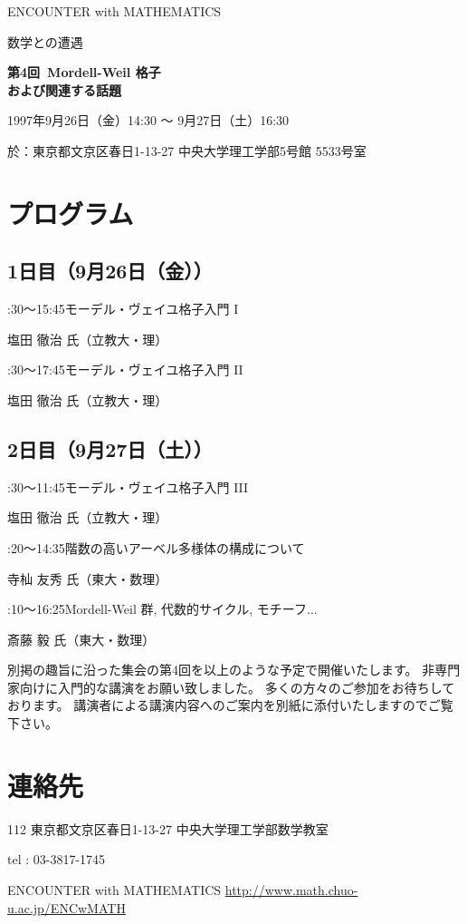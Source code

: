 \documentclass[uplatex,dvipdfmx]{jlreq}
\newcommand{\talk}[3]{%
\noindent
#1\quad #2\par
\hspace*{2em}#3\par\smallskip
}
\newcommand{\EwMnumber}{第4回}
\newcommand{\EwMtitle}{Mordell-Weil 格子\\[2mm]\large および関連する話題}
\newcommand{\EwMdate}{1997年9月26日（金）14:30 ～ 9月27日（土）16:30}
\newcommand{\EwMplace}{東京都文京区春日1-13-27 中央大学理工学部5号館 5533号室}
\newcommand{\EwMtitleblock}{

\vspace*{-5mm}

\begin{center}

{\Large ENCOUNTER with MATHEMATICS}

\vspace{2mm}

{\large 数学との遭遇}

\vspace{4mm}

{\Large \bfseries \EwMnumber\ \EwMtitle}

\vspace{4mm}

\EwMdate

\vspace{2mm}

於：\EwMplace

\end{center}

\vspace{3mm}


\vspace{2mm}

}
\begin{document}
\EwMtitleblock


\section*{プログラム}

\subsection*{1日目（9月26日（金））}

\talk
{14:30～15:45}
{モーデル・ヴェイユ格子入門 I}
{塩田 徹治 氏（立教大・理）}

\talk
{16:30～17:45}
{モーデル・ヴェイユ格子入門 II}
{塩田 徹治 氏（立教大・理）}

\subsection*{2日目（9月27日（土））}

\talk
{10:30～11:45}
{モーデル・ヴェイユ格子入門 III}
{塩田 徹治 氏（立教大・理）}

\talk
{13:20～14:35}
{階数の高いアーベル多様体の構成について}
{寺杣 友秀 氏（東大・数理）}

\talk
{15:10～16:25}
{Mordell-Weil 群, 代数的サイクル, モチーフ...}
{斎藤 毅 氏（東大・数理）}


\bigskip

別掲の趣旨に沿った集会の第4回を以上のような予定で開催いたします。  
非専門家向けに入門的な講演をお願い致しました。  
多くの方々のご参加をお待ちしております。  
講演者による講演内容へのご案内を別紙に添付いたしますのでご覧下さい。


\section*{連絡先}

112 東京都文京区春日1-13-27 中央大学理工学部数学教室

tel : 03-3817-1745

ENCOUNTER with MATHEMATICS  
\url{http://www.math.chuo-u.ac.jp/ENCwMATH}
\end{document}
